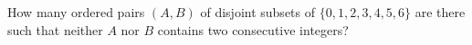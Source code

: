 How many ordered pairs $(A,B)$ of disjoint subsets of $\{0,1,2,3,4,5,6\}$ are there such that neither $A$ nor $B$ contains two consecutive integers?
